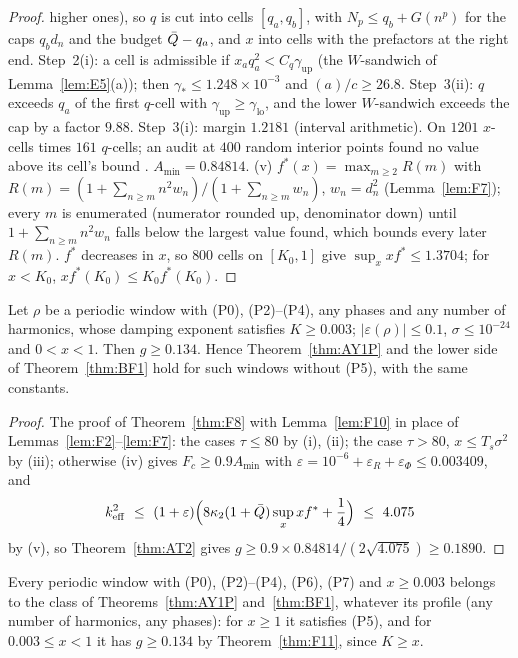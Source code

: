 \begin{proof}
higher ones), so $q$ is cut into cells $[q_a,q_b]$, with $N_p\le q_b+G(n^p)$ for the caps $q_bd_n$ and the budget $\bar Q-q_a$, and $x$ into cells with the
prefactors at the right end. Step~2(i): a cell is admissible if $x_aq_a^2<C_q\gamma_{\mathrm{up}}$ (the $W$-sandwich of Lemma~\ref{lem:E5}(a)); then
$\gamma_*\le1.248\times10^{-3}$ and $(a)/c\ge26.8$. Step~3(ii): $q$ exceeds $q_a$ of the first $q$-cell with $\gamma_{\mathrm{up}}\ge\gamma_{\mathrm{lo}}$, and the
lower $W$-sandwich exceeds the cap by a factor $9.88$. Step~3(i): margin $1.2181$ (interval arithmetic). On $1201$ $x$-cells times $161$ $q$-cells; an audit at $400$ random interior points
 found no value above its cell's bound \numst. $A_{\min}=0.84814$.
(v) $f^*(x)=\max_{m\ge2}R(m)$ with $R(m)=(1+\sum_{n\ge m}n^2w_n)/(1+\sum_{n\ge m}w_n)$, $w_n=d_n^2$ (Lemma~\ref{lem:F7}); every $m$ is enumerated (numerator
rounded up, denominator down) until $1+\sum_{n\ge m}n^2w_n$ falls below the largest value found, which bounds every later $R(m)$. $f^*$ decreases in $x$, so
$800$ cells on $[K_0,1]$ give $\sup_xxf^*\le1.3704$; for $x<K_0$, $xf^*(K_0)\le K_0f^*(K_0)$.
\end{proof}

\begin{theorem} 
\label{thm:F11}
Let $\rho$ be a periodic window with (P0), (P2)--(P4), any phases and any number of harmonics, whose damping exponent satisfies $K\ge0.003$;
$|\varepsilon(\rho)|\le0.1$, $\sigma\le10^{-24}$ and $0<x<1$. Then $g\ge0.134$. Hence Theorem~\ref{thm:AY1P} and the lower side of Theorem~\ref{thm:BF1} hold
for such windows without (P5), with the same constants.
\end{theorem}
\begin{proof}
The proof of Theorem~\ref{thm:F8} with Lemma~\ref{lem:F10} in place of Lemmas~\ref{lem:F2}--\ref{lem:F7}: the cases $\tau\le80$ by (i), (ii); the case $\tau>80$,
$x\le T_s\sigma^2$ by (iii); otherwise (iv) gives $F_c\ge0.9A_{\min}$ with $\varepsilon=10^{-6}+\varepsilon_R+\varepsilon_\Phi\le0.003409$, and
\begin{equation*}
\keff^2\ \le\ (1+\varepsilon)\Big(8\kappa_2(1+\Qb)\sup_xxf^*+\frac14\Big)\ \le\ 4.075
\end{equation*}
by (v), so Theorem~\ref{thm:AT2} gives $g\ge0.9\times0.84814/(2\sqrt{4.075})\ge0.1890$.
\end{proof}

\begin{corollary} 
\label{cor:F12}
Every periodic window with (P0), (P2)--(P4), (P6), (P7) and $x\ge0.003$ belongs to the class of Theorems~\ref{thm:AY1P} and~\ref{thm:BF1}, whatever its profile
(any number of harmonics, any phases): for $x\ge1$ it satisfies (P5), and for $0.003\le x<1$ it has $g\ge0.134$ by Theorem~\ref{thm:F11}, since $K\ge x$.
\end{corollary}

